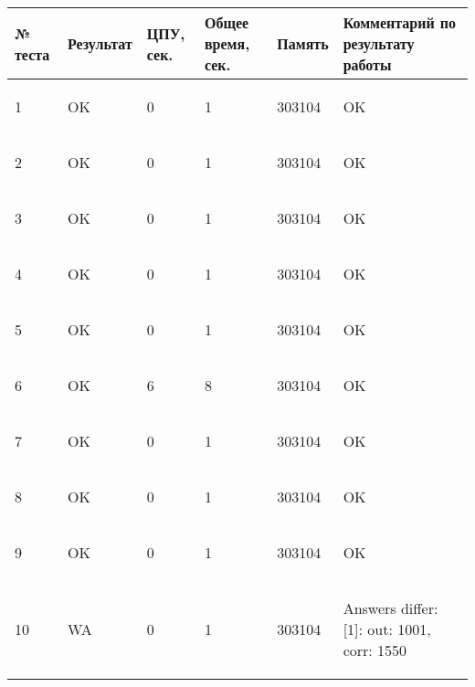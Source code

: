  \begin{longtable}{|p{1cm}|p{2.5cm}|p{1.5cm}|p{2.5cm}|p{1.5cm}|p{5cm}|}\hline
№ теста & Результат & ЦПУ, сек. & Общее время, сек. & Память & Комментарий по результату работы \\ \hline 
1 & OK & 0 & 1 & 303104 & \begin{spverbatim}OK

\end{spverbatim}  \\ \hline
2 & OK & 0 & 1 & 303104 & \begin{spverbatim}OK

\end{spverbatim}  \\ \hline
3 & OK & 0 & 1 & 303104 & \begin{spverbatim}OK

\end{spverbatim}  \\ \hline
4 & OK & 0 & 1 & 303104 & \begin{spverbatim}OK

\end{spverbatim}  \\ \hline
5 & OK & 0 & 1 & 303104 & \begin{spverbatim}OK

\end{spverbatim}  \\ \hline
6 & OK & 6 & 8 & 303104 & \begin{spverbatim}OK

\end{spverbatim}  \\ \hline
7 & OK & 0 & 1 & 303104 & \begin{spverbatim}OK

\end{spverbatim}  \\ \hline
8 & OK & 0 & 1 & 303104 & \begin{spverbatim}OK

\end{spverbatim}  \\ \hline
9 & OK & 0 & 1 & 303104 & \begin{spverbatim}OK

\end{spverbatim}  \\ \hline
10 & WA & 0 & 1 & 303104 & \begin{spverbatim}Answers differ: [1]: out: 1001, corr: 1550

\end{spverbatim}  \\ \hline
\end{longtable}